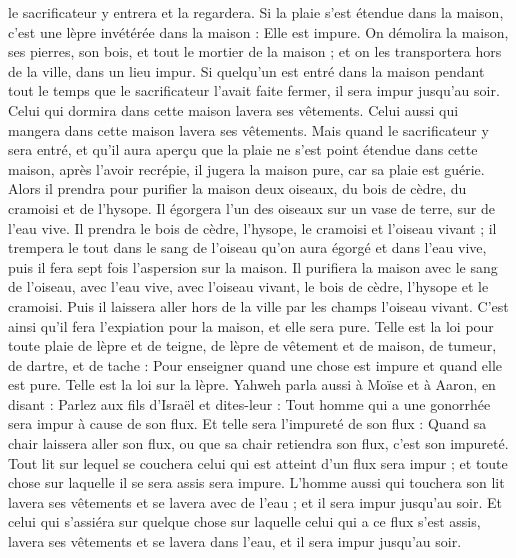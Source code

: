 \begin{multicols}{2}
le sacrificateur y entrera et la regardera. Si la plaie s’est étendue dans la maison, c'est une lèpre invétérée dans la maison : Elle est impure.
On démolira la maison, ses pierres, son bois, et tout le mortier de la maison ; et on les transportera hors de la ville, dans un lieu impur.
Si quelqu'un est entré dans la maison pendant tout le temps que le sacrificateur l'avait faite fermer, il sera impur jusqu'au soir.
Celui qui dormira dans cette maison lavera ses vêtements. Celui aussi qui mangera dans cette maison lavera ses vêtements.
Mais quand le sacrificateur y sera entré, et qu'il aura aperçu que la plaie ne s’est point étendue dans cette maison, après l'avoir recrépie, il jugera la maison pure, car sa plaie est guérie.
Alors il prendra pour purifier la maison deux oiseaux, du bois de cèdre, du cramoisi et de l'hysope.
Il égorgera l'un des oiseaux sur un vase de terre, sur de l'eau vive.
Il prendra le bois de cèdre, l'hysope, le cramoisi et l’oiseau vivant ; il trempera le tout dans le sang de l’oiseau qu'on aura égorgé et dans l'eau vive, puis il fera sept fois l’aspersion sur la maison.
Il purifiera la maison avec le sang de l’oiseau, avec l'eau vive, avec l’oiseau vivant, le bois de cèdre, l'hysope et le cramoisi.
Puis il laissera aller hors de la ville par les champs l’oiseau vivant. C’est ainsi qu’il fera l’expiation pour la maison, et elle sera pure.
Telle est la loi pour toute plaie de lèpre et de teigne,
de lèpre de vêtement et de maison,
de tumeur, de dartre, et de tache :
Pour enseigner quand une chose est impure et quand elle est pure. Telle est la loi sur la lèpre.
\VerseOne{}Yahweh parla aussi à Moïse et à Aaron, en disant :
Parlez aux fils d'Israël et dites-leur : Tout homme qui a une gonorrhée sera impur à cause de son flux.
Et telle sera l’impureté de son flux : Quand sa chair laissera aller son flux, ou que sa chair retiendra son flux, c'est son impureté.
Tout lit sur lequel se couchera celui qui est atteint d’un flux sera impur ; et toute chose sur laquelle il se sera assis sera impure.
L’homme aussi qui touchera son lit lavera ses vêtements et se lavera avec de l'eau ; et il sera impur jusqu'au soir.
Et celui qui s'assiéra sur quelque chose sur laquelle celui qui a ce flux s’est assis, lavera ses vêtements et se lavera dans l'eau, et il sera impur jusqu'au soir.

\end{multicols}
